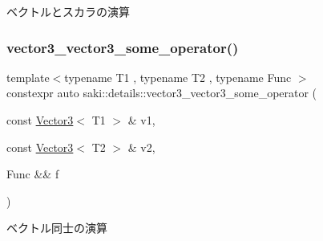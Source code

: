 ベクトルとスカラの演算 

\mbox{\label{namespacesaki_1_1details_a9d9fd5673ab6516752ecf05845e7f9b9}} 
\subsubsection{\texorpdfstring{vector3\+\_\+vector3\+\_\+some\+\_\+operator()}{vector3\_vector3\_some\_operator()}}
{\footnotesize\ttfamily template$<$typename T1 , typename T2 , typename Func $>$ \\
constexpr auto saki\+::details\+::vector3\+\_\+vector3\+\_\+some\+\_\+operator (\begin{DoxyParamCaption}\item[{const \mbox{\hyperlink{classsaki_1_1_vector3}{Vector3}}$<$ T1 $>$ \&}]{v1,  }\item[{const \mbox{\hyperlink{classsaki_1_1_vector3}{Vector3}}$<$ T2 $>$ \&}]{v2,  }\item[{Func \&\&}]{f }\end{DoxyParamCaption})}



ベクトル同士の演算 


